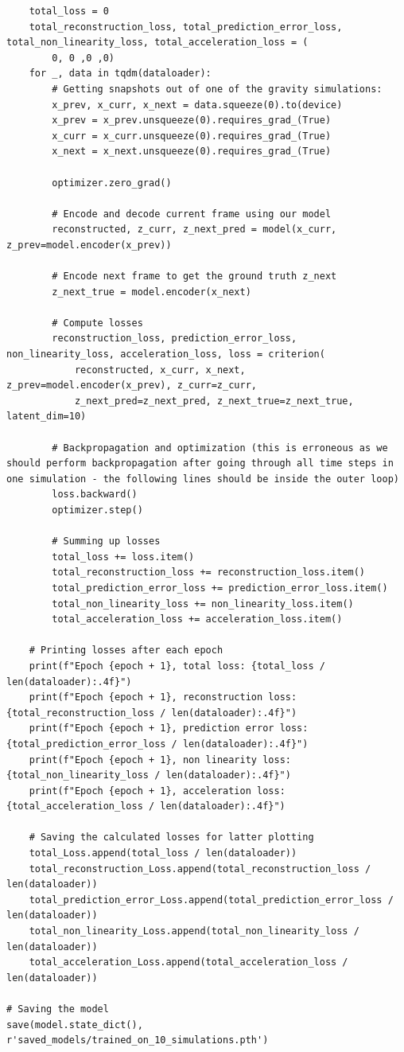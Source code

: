 \documentclass[12pt,letterpaper]{article}
\begin{document}
\begin{lstlisting}
    total_loss = 0
    total_reconstruction_loss, total_prediction_error_loss, total_non_linearity_loss, total_acceleration_loss = (
        0, 0 ,0 ,0)
    for _, data in tqdm(dataloader):
        # Getting snapshots out of one of the gravity simulations:
        x_prev, x_curr, x_next = data.squeeze(0).to(device)
        x_prev = x_prev.unsqueeze(0).requires_grad_(True)
        x_curr = x_curr.unsqueeze(0).requires_grad_(True)
        x_next = x_next.unsqueeze(0).requires_grad_(True)

        optimizer.zero_grad()

        # Encode and decode current frame using our model
        reconstructed, z_curr, z_next_pred = model(x_curr, z_prev=model.encoder(x_prev))

        # Encode next frame to get the ground truth z_next
        z_next_true = model.encoder(x_next)

        # Compute losses
        reconstruction_loss, prediction_error_loss, non_linearity_loss, acceleration_loss, loss = criterion(
            reconstructed, x_curr, x_next, z_prev=model.encoder(x_prev), z_curr=z_curr,
            z_next_pred=z_next_pred, z_next_true=z_next_true, latent_dim=10)

        # Backpropagation and optimization (this is erroneous as we should perform backpropagation after going through all time steps in one simulation - the following lines should be inside the outer loop)
        loss.backward()
        optimizer.step()

        # Summing up losses
        total_loss += loss.item()
        total_reconstruction_loss += reconstruction_loss.item()
        total_prediction_error_loss += prediction_error_loss.item()
        total_non_linearity_loss += non_linearity_loss.item()
        total_acceleration_loss += acceleration_loss.item()

    # Printing losses after each epoch
    print(f"Epoch {epoch + 1}, total loss: {total_loss / len(dataloader):.4f}")
    print(f"Epoch {epoch + 1}, reconstruction loss: {total_reconstruction_loss / len(dataloader):.4f}")
    print(f"Epoch {epoch + 1}, prediction error loss: {total_prediction_error_loss / len(dataloader):.4f}")
    print(f"Epoch {epoch + 1}, non linearity loss: {total_non_linearity_loss / len(dataloader):.4f}")
    print(f"Epoch {epoch + 1}, acceleration loss: {total_acceleration_loss / len(dataloader):.4f}")

    # Saving the calculated losses for latter plotting
    total_Loss.append(total_loss / len(dataloader))
    total_reconstruction_Loss.append(total_reconstruction_loss / len(dataloader))
    total_prediction_error_Loss.append(total_prediction_error_loss / len(dataloader))
    total_non_linearity_Loss.append(total_non_linearity_loss / len(dataloader))
    total_acceleration_Loss.append(total_acceleration_loss / len(dataloader))

# Saving the model
save(model.state_dict(), r'saved_models/trained_on_10_simulations.pth')
\end{lstlisting}
\end{document}
